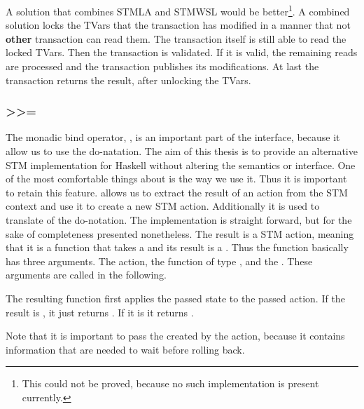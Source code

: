 A solution that combines STMLA and STMWSL would be better\footnote{This could 
not be proved, because no such implementation is present currently.}.
A combined solution locks the TVars that the transaction has modified in a 
manner that not \textbf{other} transaction can read them. The transaction itself
is still able to read the locked TVars. Then the transaction is validated. 
If it is valid, the remaining reads are processed and the transaction publishes
its modifications. At last the transaction returns the result, after unlocking
the TVars.

\subsubsection{>>=}
The monadic bind operator, \code{>>=}, is an important part of the interface, because it allow us 
to use the do-natation. The aim of this thesis is to provide an alternative STM 
implementation for Haskell without altering the semantics or interface. One of 
the most comfortable things about is the way we use it. Thus it is important to 
retain this feature.  allows us to 
extract the result of an  action from the STM context and use it to create 
a new STM action. Additionally it is used to translate \code{<-} of the do-notation.
The implementation is straight forward, but for the sake of completeness presented
nonetheless. The result is a STM action, meaning that it is a function that takes 
a  and its result is a . Thus the function basically
has three arguments. The  action, the function of type ,
and the . These arguments are called 
in the following. 

The resulting function first applies the passed state to the passed action. 
If the result is , it just returns . If it is
 it returns . 

Note that it is important to 
pass the  created by the action, because it contains information that
are needed to wait before rolling back. 


